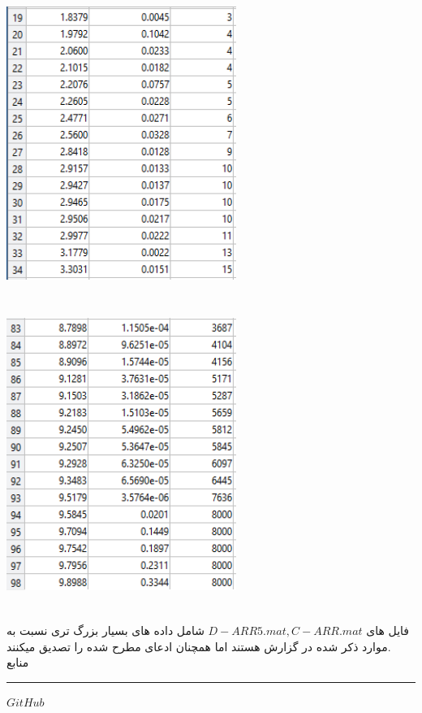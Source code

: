 \documentclass[12pt, letterpaper]{article}
\begin{document}
\includegraphics[height=10cm, width=75mm]{figure5.png}
\includegraphics[height=10cm, width=75mm]{figure6.png}

\vspace{10mm}
فایل های 
$ D-ARR5.mat , C-ARR.mat $
شامل داده های بسیار بزرگ تری نسبت به موارد ذکر شده در گزارش هستند اما همچنان ادعای مطرح شده را  تصدیق میکنند.
\vspace{10mm}
\\
منابع
\rule{\textwidth}{0.5pt} 
\href{https://github.com/ehsan1381/Numerical-Analysis-Project-1}{$GitHub$}
\end{document}
